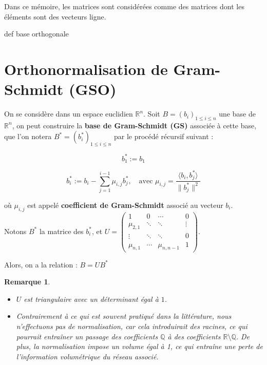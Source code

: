 \documentclass[a4paper,12pt]{report}  %
\theoremstyle{definitionstyle}
\theoremstyle{examplestyle}
\theoremstyle{remarkstyle}
\newtheorem{remark}{Remarque}[chapter] %
\theoremstyle{propositionstyle}
\theoremstyle{theoremstyle}
\theoremstyle{proofstyle}
\begin{document}
	Dans ce mémoire, les matrices sont considérées comme des matrices dont les éléments sont des vecteurs ligne.
	
	
	def base orthogonale
	
	\section{Orthonormalisation de Gram-Schmidt (GSO)}
	
	On se considère dans un espace euclidien $\mathbb{R}^n$. Soit \( B = (b_i)_{1 \leq i \leq n} \) une base de \( \mathbb{R}^n \), on peut construire la \textbf{base de Gram-Schmidt (GS)} associée à cette base, que l'on notera \( B^* = (b^*_i)_{1 \leq i \leq n} \) par le procédé récursif suivant :
	
	
	$$b_1^* := b_1$$
	
	
	$$b_i^* := b_i - \sum_{j=1}^{i-1} \mu_{i,j} b_j^*, \quad \text{avec } \mu_{i,j} = \frac{\langle b_i, b_j^* \rangle}{\| b_j^* \|^2}$$
	
	où \( \mu_{i,j} \) est appelé \textbf{coefficient de Gram-Schmidt} associé au vecteur \( b_i \). \\
	
	Notons \( B^* \) la matrice des \( b_i^* \), et \( U = \left(\begin{array}{rrrr}
		1 & 0 & \cdots & 0\\
		\mu_{2,1} & \ddots & \ddots & \vdots\\
		\vdots & \ddots & \ddots & 0\\
		\mu_{n,1} & \cdots & \mu_{n,n-1} & 1
	\end{array}\right)\). 

Alors, on a la relation : $B = UB^*$
	
	 \begin{remark}
	 	\begin{itemize}
	 		\item  $U$ est triangulaire avec un déterminant égal à $1$.
	 		\item Contrairement à ce qui est souvent pratiqué dans la littérature, nous n'effectuons pas de normalisation, car cela introduirait des racines, ce qui pourrait entraîner un passage des coefficients \( \mathbb{Q} \) à des coefficients \( \mathbb{R} \setminus \mathbb{Q} \). De plus, la normalisation impose un volume égal à 1, ce qui entraîne une perte de l'information volumétrique du réseau associé.
	 		
	 	\end{itemize}
 	\end{remark}
	
\end{document}
